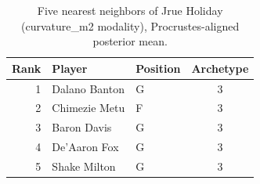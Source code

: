 \begin{table}[htbp]
  \centering\small
  \begin{tabular}{rllc}
    \toprule
    Rank & Player & Position & Archetype \\
    \midrule
    1 & Dalano Banton & G & 3 \\
    2 & Chimezie Metu & F & 3 \\
    3 & Baron Davis & G & 3 \\
    4 & De'Aaron Fox & G & 3 \\
    5 & Shake Milton & G & 3 \\
    \bottomrule
  \end{tabular}
  \caption{Five nearest neighbors of Jrue Holiday (curvature_m2 modality), Procrustes-aligned posterior mean.}
  \label{tab:Jrue_Holiday_neighbors_curvature_m2}
\end{table}

